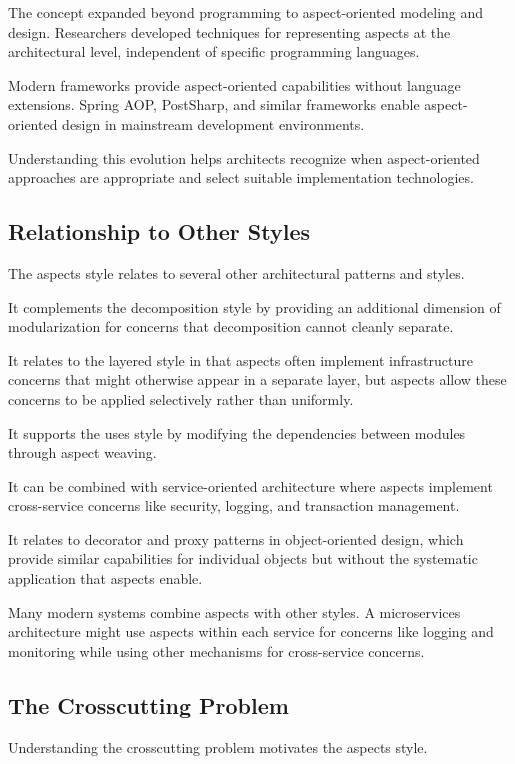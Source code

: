 \documentclass[11pt]{article}
\begin{document}
The concept expanded beyond programming to aspect-oriented modeling and design. Researchers developed techniques for representing aspects at the architectural level, independent of specific programming languages.

Modern frameworks provide aspect-oriented capabilities without language extensions. Spring AOP, PostSharp, and similar frameworks enable aspect-oriented design in mainstream development environments.

Understanding this evolution helps architects recognize when aspect-oriented approaches are appropriate and select suitable implementation technologies.

\subsection{Relationship to Other Styles}

The aspects style relates to several other architectural patterns and styles.

It complements the decomposition style by providing an additional dimension of modularization for concerns that decomposition cannot cleanly separate.

It relates to the layered style in that aspects often implement infrastructure concerns that might otherwise appear in a separate layer, but aspects allow these concerns to be applied selectively rather than uniformly.

It supports the uses style by modifying the dependencies between modules through aspect weaving.

It can be combined with service-oriented architecture where aspects implement cross-service concerns like security, logging, and transaction management.

It relates to decorator and proxy patterns in object-oriented design, which provide similar capabilities for individual objects but without the systematic application that aspects enable.

Many modern systems combine aspects with other styles. A microservices architecture might use aspects within each service for concerns like logging and monitoring while using other mechanisms for cross-service concerns.

\subsection{The Crosscutting Problem}

Understanding the crosscutting problem motivates the aspects style.
\end{document}
